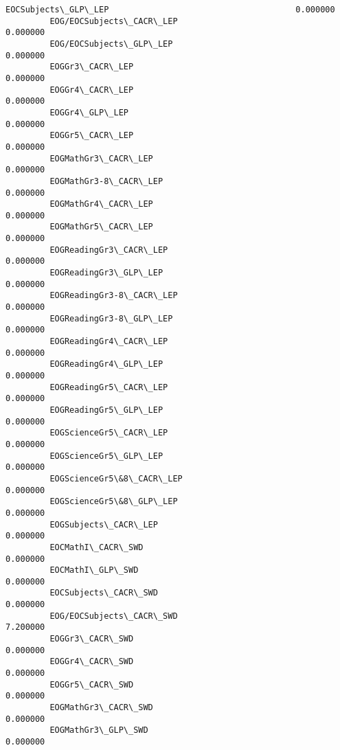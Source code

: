 \documentclass[11pt]{article}
\begin{document}
\begin{Verbatim}[commandchars=\\\{\}]
         EOCSubjects\_GLP\_LEP                                      0.000000   
         EOG/EOCSubjects\_CACR\_LEP                                 0.000000   
         EOG/EOCSubjects\_GLP\_LEP                                  0.000000   
         EOGGr3\_CACR\_LEP                                          0.000000   
         EOGGr4\_CACR\_LEP                                          0.000000   
         EOGGr4\_GLP\_LEP                                           0.000000   
         EOGGr5\_CACR\_LEP                                          0.000000   
         EOGMathGr3\_CACR\_LEP                                      0.000000   
         EOGMathGr3-8\_CACR\_LEP                                    0.000000   
         EOGMathGr4\_CACR\_LEP                                      0.000000   
         EOGMathGr5\_CACR\_LEP                                      0.000000   
         EOGReadingGr3\_CACR\_LEP                                   0.000000   
         EOGReadingGr3\_GLP\_LEP                                    0.000000   
         EOGReadingGr3-8\_CACR\_LEP                                 0.000000   
         EOGReadingGr3-8\_GLP\_LEP                                  0.000000   
         EOGReadingGr4\_CACR\_LEP                                   0.000000   
         EOGReadingGr4\_GLP\_LEP                                    0.000000   
         EOGReadingGr5\_CACR\_LEP                                   0.000000   
         EOGReadingGr5\_GLP\_LEP                                    0.000000   
         EOGScienceGr5\_CACR\_LEP                                   0.000000   
         EOGScienceGr5\_GLP\_LEP                                    0.000000   
         EOGScienceGr5\&8\_CACR\_LEP                                 0.000000   
         EOGScienceGr5\&8\_GLP\_LEP                                  0.000000   
         EOGSubjects\_CACR\_LEP                                     0.000000   
         EOCMathI\_CACR\_SWD                                        0.000000   
         EOCMathI\_GLP\_SWD                                         0.000000   
         EOCSubjects\_CACR\_SWD                                     0.000000   
         EOG/EOCSubjects\_CACR\_SWD                                 7.200000   
         EOGGr3\_CACR\_SWD                                          0.000000   
         EOGGr4\_CACR\_SWD                                          0.000000   
         EOGGr5\_CACR\_SWD                                          0.000000   
         EOGMathGr3\_CACR\_SWD                                      0.000000   
         EOGMathGr3\_GLP\_SWD                                       0.000000   

\end{Verbatim}
\end{document}
